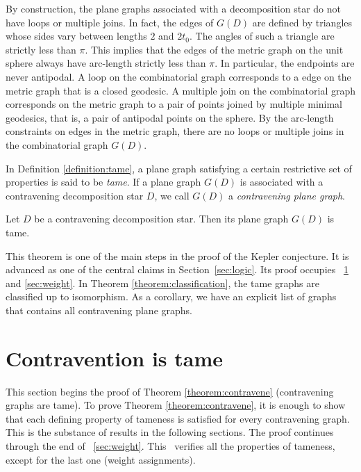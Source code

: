 By construction, the plane graphs associated with a decomposition
star do not have loops or multiple joins.  In fact, the edges of
$G(D)$ are defined by triangles whose sides vary between lengths
$2$ and $2t_0 $. The angles of such a triangle are strictly less
than $\pi$.  This implies that the edges of the metric graph on
the unit sphere always have arc-length strictly less than $\pi$.
In particular, the endpoints are never antipodal.  A loop on the
combinatorial graph corresponds to a edge on the metric graph that
is a closed geodesic.  A multiple join on the combinatorial graph
corresponds on the metric graph to a pair of points joined by
multiple minimal geodesics, that is, a pair of antipodal points on
the sphere.  By the arc-length constraints on edges in the metric
graph, there are no loops or multiple joins in the combinatorial
graph $G(D)$.

In Definition \ref{definition:tame}, a plane graph satisfying a
certain restrictive set of properties is said to be {\it tame}. If
a plane graph $G(D)$ is associated with a contravening
decomposition star $D$, we call $G(D)$ a {\it contravening plane
graph}.
%

\begin{theorem} \label{theorem:contravene}  Let $D$ be a
contravening decomposition star.  Then its plane graph $G(D)$ is
tame.
\end{theorem}

This theorem is one of the main steps in the proof of the Kepler
conjecture. It is advanced as one of the central claims in
Section~\ref{sec:logic}.  Its proof occupies
\Chaps~\ref{sec:contraproof} and \ref{sec:weight}. In Theorem
\ref{theorem:classification}, the tame graphs  are classified up to
isomorphism. As a corollary, we have an explicit list of graphs that
contains all contravening plane graphs.


\chapter{Contravention is tame}
    \label{sec:contraproof}

This section begins the proof of Theorem \ref{theorem:contravene}
(contravening graphs are tame). To prove Theorem
\ref{theorem:contravene}, it is enough to show that each defining
property of tameness is satisfied for every contravening graph.
This is the substance of results in the following sections. The
proof continues through the end of \Chap~\ref{sec:weight}. This
\chap\ verifies all the properties of tameness, except for the
last one (weight assignments).

